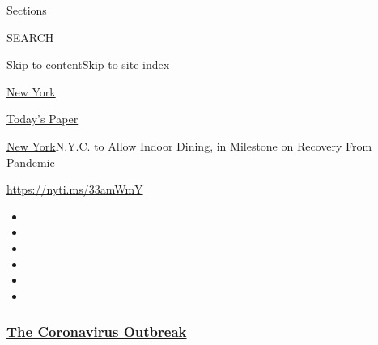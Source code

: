 Sections

SEARCH

\protect\hyperlink{site-content}{Skip to
content}\protect\hyperlink{site-index}{Skip to site index}

\href{https://www.nytimes3xbfgragh.onion/section/nyregion}{New York}

\href{https://myaccount.nytimes3xbfgragh.onion/auth/login?response_type=cookie\&client_id=vi}{}

\href{https://www.nytimes3xbfgragh.onion/section/todayspaper}{Today's
Paper}

\href{/section/nyregion}{New York}\textbar{}N.Y.C. to Allow Indoor
Dining, in Milestone on Recovery From Pandemic

\url{https://nyti.ms/33amWmY}

\begin{itemize}
\item
\item
\item
\item
\item
\item
\end{itemize}

\hypertarget{the-coronavirus-outbreak}{%
\subsubsection{\texorpdfstring{\href{https://www.nytimes3xbfgragh.onion/news-event/coronavirus?name=styln-coronavirus-national\&region=TOP_BANNER\&block=storyline_menu_recirc\&action=click\&pgtype=Article\&impression_id=faa237d0-f52d-11ea-8b73-3bde8420cfaf\&variant=undefined}{The
Coronavirus
Outbreak}}{The Coronavirus Outbreak}}\label{the-coronavirus-outbreak}}

